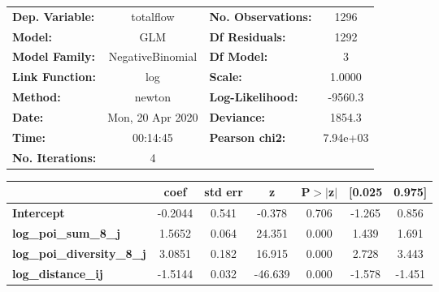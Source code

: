 \begin{center}
\begin{tabular}{lclc}
\toprule
\textbf{Dep. Variable:}            &    totalflow     & \textbf{  No. Observations:  } &     1296    \\
\textbf{Model:}                    &       GLM        & \textbf{  Df Residuals:      } &     1292    \\
\textbf{Model Family:}             & NegativeBinomial & \textbf{  Df Model:          } &        3    \\
\textbf{Link Function:}            &       log        & \textbf{  Scale:             } &    1.0000   \\
\textbf{Method:}                   &      newton      & \textbf{  Log-Likelihood:    } &   -9560.3   \\
\textbf{Date:}                     & Mon, 20 Apr 2020 & \textbf{  Deviance:          } &    1854.3   \\
\textbf{Time:}                     &     00:14:45     & \textbf{  Pearson chi2:      } &  7.94e+03   \\
\textbf{No. Iterations:}           &        4         & \textbf{                     } &             \\
\bottomrule
\end{tabular}
\begin{tabular}{lcccccc}
                                   & \textbf{coef} & \textbf{std err} & \textbf{z} & \textbf{P$> |$z$|$} & \textbf{[0.025} & \textbf{0.975]}  \\
\midrule
\textbf{Intercept}                 &      -0.2044  &        0.541     &    -0.378  &         0.706        &       -1.265    &        0.856     \\
\textbf{log\_poi\_sum\_8\_j}       &       1.5652  &        0.064     &    24.351  &         0.000        &        1.439    &        1.691     \\
\textbf{log\_poi\_diversity\_8\_j} &       3.0851  &        0.182     &    16.915  &         0.000        &        2.728    &        3.443     \\
\textbf{log\_distance\_ij}         &      -1.5144  &        0.032     &   -46.639  &         0.000        &       -1.578    &       -1.451     \\
\bottomrule
\end{tabular}
\end{center}